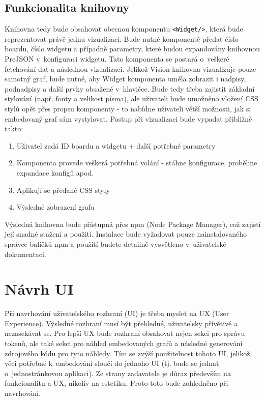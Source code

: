 \documentclass[czech, bc, kiv, he, iso690numb]{fasthesis}
\begin{document}
\subsection{Funkcionalita knihovny}
Knihovna tedy bude obsahovat obecnou komponentu \texttt{<Widget/>}, která bude reprezentovat právě jednu vizualizaci. Bude nutné komponentě předat číslo boardu, číslo widgetu a případně parametry, které 
budou expandovány knihovnou PreJSON v~konfiguraci widgetu. Tato komponenta se postará o~veškeré fetchování dat a následnou vizualizaci. Jelikož Vision knihovna vizualizuje pouze samotný graf, bude nutné, aby
Widget komponenta uměla zobrazit i nadpisy, podnadpisy a další prvky obsažené v~hlavičce. Bude tedy třeba zajistit základní stylování (např. fonty a velikost písma), ale uživateli bude umožněno vložení CSS stylů
opět přes propsu komponenty - to nabídne uživateli větší možnosti, jak si embedovaný graf sám vystylovat. Postup při vizualizaci bude vypadat přibližně takto:

\begin{enumerate}
	\item Uživatel zadá ID boardu a widgetu + další potřebné parametry
	\item Komponenta provede veškerá potřebná volání - stáhne konfigurace, proběhne expandace konfigů apod.
	\item Aplikují se předané CSS styly 
	\item Výsledné zobrazení grafu
\end{enumerate}

Výsledná knihovna bude přístupná přes npm (Node Package Manager), což zajistí její snadné stažení a použití. Instalace bude vyžadovat pouze nainstalovaného správce balíčků npm a použití budete
detailně vysvětleno v~uživatelské dokumentaci.

\section{Návrh UI}

Při navrhování uživatelského rozhraní (UI) je třeba myslet na UX (User Experience). Výsledné rozhraní musí být přehledné, uživatelsky přívětivé a nezasekávat se. Pro lepší UX bude rozhraní 
obsahovat nejen sekci pro správu tokenů, ale také sekci pro náhled embedovaných grafů a následné generování zdrojového kódu pro tyto náhledy. Tím se zvýší použitelnost tohoto UI, jelikož 
věci potřebné k~embedování sloučí do jednoho UI (tj. bude se jednat o~jednostránkovou aplikaci). Ze strany zadavatele je důraz především na funkcionalitu a UX, nikoliv na estetiku. Proto toto bude zohledněno při navrhování.
\end{document}
